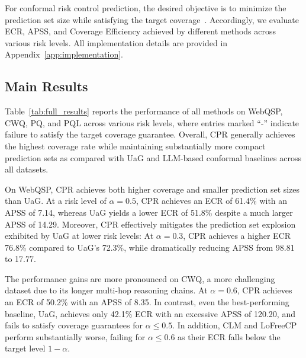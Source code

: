 \documentclass{article}
\theoremstyle{plain}
\theoremstyle{definition}
\theoremstyle{remark}
\begin{document}
For conformal risk control prediction, the desired objective is to minimize the prediction set size while satisfying the target coverage~\citep{cp_intro}.
Accordingly, we evaluate ECR, APSS, and Coverage Efficiency achieved by different methods across various risk levels. All implementation details are provided in Appendix~\ref{app:implementation}.


\subsection{Main Results}
Table~\ref{tab:full_results} reports the performance of all methods on WebQSP, CWQ, PQ, and PQL across various risk levels, where entries marked ``-'' indicate failure to satisfy the target coverage guarantee. Overall, CPR generally achieves the highest coverage rate while maintaining substantially more compact prediction sets as compared with UaG and LLM-based conformal baselines across all datasets.
 
On WebQSP, CPR achieves both higher coverage and smaller prediction set sizes than UaG. At a risk level of $\alpha=0.5$, CPR achieves an ECR of 61.4\% with an APSS of 7.14, whereas UaG yields a lower ECR of 51.8\% despite a much larger APSS of 14.29.
Moreover, CPR effectively mitigates the prediction set explosion exhibited by UaG at lower risk levels: At $\alpha=0.3$, CPR achieves a higher ECR 76.8\% compared to UaG's 72.3\%, while dramatically reducing APSS from 98.81 to 17.77.
 
The performance gains are more pronounced on CWQ, a more challenging dataset due to its longer multi-hop reasoning chains. At $\alpha=0.6$, CPR achieves an ECR of 50.2\% with an APSS of 8.35. In contrast, even the best-performing baseline, UaG, achieves only 42.1\% ECR with an excessive APSS of 120.20, and fails to satisfy coverage guarantees for $\alpha \leq 0.5$. In addition, CLM and LoFreeCP perform substantially worse, failing for $\alpha \leq 0.6$ as their ECR falls below the target level $1-\alpha$. %
 
\end{document}
